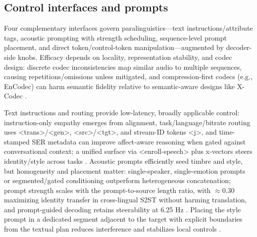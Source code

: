 \documentclass{article}
\begin{document}
\subsection{Control interfaces and prompts} \label{subsec:controlinterfacesandprompts}
Four complementary interfaces govern paralinguistics---text instructions/attribute tags, acoustic prompting with strength scheduling, sequence-level prompt placement, and direct token/control-token manipulation---augmented by decoder-side knobs. Efficacy depends on locality, representation stability, and codec design: discrete codec inconsistencies map similar audio to multiple sequences, causing repetitions/omissions unless mitigated, and compression-first codecs (e.g., EnCodec) can harm semantic fidelity relative to semantic-aware designs like X-Codec \cite{liu2024analyzingmitigatinginconsistencydiscrete,ye2024codecdoesmatterexploringsemanticshortcom,fily2024establishingdegreesclosenessbetweenaudio}.

Text instructions and routing provide low-latency, broadly applicable control: instruction-only empathy emerges from alignment, task/language/bitrate routing uses <trans>/<gen>, <src>/<tgt>, and stream-ID tokens <j>, and time-stamped SER metadata can improve affect-aware reasoning when gated against conversational context; a unified surface via <enroll-speech> plus x-vectors steers identity/style across tasks \cite{wang2024blspemotowardsempatheticlargespeechlangu,peng2024mslms2stmultitaskspeechlanguagemodeltext,wang2025incorporatingcontextualparalinguisticund,wu2024speechcomposerunifyingmultiplespeechtask}. Acoustic prompts efficiently seed timbre and style, but homogeneity and placement matter: single-speaker, single-emotion prompts or segmented/gated conditioning outperform heterogeneous concatenation; prompt strength scales with the prompt-to-source length ratio, with $\approx$0.30 maximizing identity transfer in cross-lingual S2ST without harming translation, and prompt-guided decoding retains steerability at 6.25 Hz \cite{peng2024empiricalstudyspeechlanguagemodelsprompt,gong2024seamlessexpressivelmspeechlanguagemodele,wang2025tadicodectextawarediffusionspeechtokeniz}. Placing the style prompt in a dedicated segment adjacent to the target with explicit boundaries from the textual plan reduces interference and stabilizes local controls \cite{wu2024speechcomposerunifyingmultiplespeechtask}.
\end{document}
